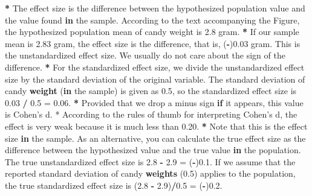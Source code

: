 \documentclass[a4paper]{book}
\newenvironment{Shaded}{\begin{snugshade}}{\end{snugshade}}
\newcommand{\KeywordTok}[1]{\textcolor[rgb]{0,0,0}{\textbf{#1}}}
\newcommand{\FloatTok}[1]{\textcolor[rgb]{0.00,0.00,0.00}{#1}}
\newcommand{\StringTok}[1]{\textcolor[rgb]{0.00,0.00,0.00}{#1}}
\newcommand{\ControlFlowTok}[1]{\textcolor[rgb]{0.00,0.00,0.00}{\textbf{#1}}}
\newcommand{\OperatorTok}[1]{\textcolor[rgb]{0.00,0.00,0.00}{\textbf{#1}}}
\newcommand{\NormalTok}[1]{#1}
\theoremstyle{definition}
\theoremstyle{definition}
\theoremstyle{definition}
\theoremstyle{remark}
\begin{document}
\begin{Shaded}
\begin{Highlighting}[]
\OperatorTok{*}\StringTok{ }\NormalTok{The effect size is the difference between the hypothesized population value}
\NormalTok{and the value found }\ControlFlowTok{in}\NormalTok{ the sample. According to the text accompanying the}
\NormalTok{Figure, the hypothesized population mean of candy weight is }\FloatTok{2.8}\NormalTok{ gram.}
\OperatorTok{*}\StringTok{ }\NormalTok{If our sample mean is }\FloatTok{2.83}\NormalTok{ gram, the effect size is the difference, that is,}
\NormalTok{(}\OperatorTok{-}\NormalTok{)}\FloatTok{0.03}\NormalTok{ gram. This is the unstandardized effect size. We usually do not care}
\NormalTok{about the sign of the difference.}
\OperatorTok{*}\StringTok{ }\NormalTok{For the standardized effect size, we divide the unstandardized effect size}
\NormalTok{by the standard deviation of the original variable. The standard deviation of}
\NormalTok{candy }\KeywordTok{weight}\NormalTok{ (}\ControlFlowTok{in}\NormalTok{ the sample) is given as }\FloatTok{0.5}\NormalTok{, so the standardized effect}
\NormalTok{size is }\FloatTok{0.03} \OperatorTok{/}\StringTok{ }\FloatTok{0.5}\NormalTok{ =}\StringTok{ }\FloatTok{0.06}\NormalTok{.}
\OperatorTok{*}\StringTok{ }\NormalTok{Provided that we drop a minus sign }\ControlFlowTok{if}\NormalTok{ it appears, this value is Cohen}\StringTok{'s d.}
\StringTok{* According to the rules of thumb for interpreting Cohen'}\NormalTok{s d, the effect is}
\NormalTok{very weak because it is much less than }\FloatTok{0.20}\NormalTok{.}
\OperatorTok{*}\StringTok{ }\NormalTok{Note that this is the effect size }\ControlFlowTok{in}\NormalTok{ the sample. As an alternative, you can}
\NormalTok{calculate the true effect size as the difference between the hypothesized value}
\NormalTok{and the true value }\ControlFlowTok{in}\NormalTok{ the population. The true unstandardized effect size is}
\FloatTok{2.8} \OperatorTok{-}\StringTok{ }\FloatTok{2.9}\NormalTok{ =}\StringTok{ }\NormalTok{(}\OperatorTok{-}\NormalTok{)}\FloatTok{0.1}\NormalTok{. If we assume that the reported standard deviation of candy}
\KeywordTok{weights}\NormalTok{ (}\FloatTok{0.5}\NormalTok{) applies to the population, the true standardized effect size is}
\NormalTok{(}\FloatTok{2.8} \OperatorTok{-}\StringTok{ }\FloatTok{2.9}\NormalTok{)}\OperatorTok{/}\FloatTok{0.5}\NormalTok{ =}\StringTok{ }\NormalTok{(}\OperatorTok{-}\NormalTok{)}\FloatTok{0.2}\NormalTok{.}
\end{Highlighting}
\end{Shaded}
\end{document}
